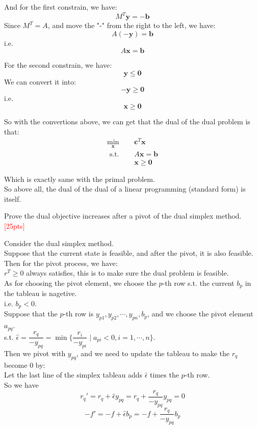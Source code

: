 \documentclass[10pt]{article}
\newenvironment{problem}[2][Problem]{\begin{trivlist}
\item[\hskip \labelsep {\bfseries #1}\hskip \labelsep {\bfseries #2.}]}{\end{trivlist}}
\begin{document}
And for the first constrain, we have:
$$M^T\bm{y} = \bm{-b}$$
Since $M^T=A$, and move the "-" from the right to the left, we have:
$$A\bm{(-y)} = \bm{b}$$
i.e.
$$A\bm{x} = \bm{b}$$

For the second constrain, we have:
$$\bm{y}\leq\bm{0}$$
We can convert it into:
$$\bm{-y}\geq\bm{0}$$
i.e.
$$\bm{x}\geq\bm{0}$$

So with the convertions above, we can get that the dual of the dual problem is that:
\begin{equation}
\begin{aligned}
\min_{\bm{x}} \quad & \bm{c}^T\bm{x} \\
\text { s.t. } \quad & A\bm{x} = \bm{b} \\
& \bm{x} \geq \bm{0}
\end{aligned}
\end{equation}

Which is exactly same with the primal problem.\\
So above all, the dual of the dual of a linear programming (standard form) is itself.\\

\newpage


\begin{problem}{2}
    Prove the dual objective increases after a pivot of the dual simplex method.\textcolor{red}{[25pts]}
\end{problem}

Consider the dual simplex method.\\
Suppose that the current state is feasible, and after the pivot, it is also feasible.\\
Then for the pivot process, we have:\\
$r^T\geq 0$ always satisfies, this is to make sure the dual problem is feasible.\\
As for choosing the pivot element, we choose the $p$-th row s.t. the current $b_p$ in the tableau is nagetive.\\
i.e. $b_p<0$.\\
Suppose that the $p$-th row is $y_{p1},y_{p2},\cdots,y_{pn},b_p$, and we choose the pivot element $a_{pq}$.\\
s.t. $\hat{\epsilon}=\dfrac{r_q}{-y_{pq}} = \min\{\dfrac{r_i}{-y_{pi}}\mid a_{pi}<0,i=1,\cdots,n\}$.\\
Then we pivot with $y_{pq}$, and we need to update the tableau to make the $r_q$ become $0$ by:\\
Let the last line of the simplex tableau adds $\hat{\epsilon}$ times the $p$-th row.\\
So we have
$$r_q'=r_q+\hat{\epsilon}y_{pq}=r_q+\dfrac{r_q}{-y_{pq}}y_{pq}=0$$
$$-f'=-f+\hat{\epsilon}b_p=-f+\dfrac{r_q}{-y_{pq}}b_p$$
\end{document}
